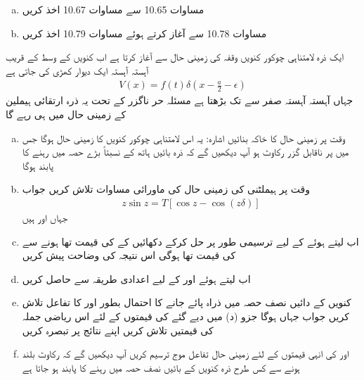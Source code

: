 \begin{enumerate}[a.]
\item
مساوات 10.65 سے مساوات 10.67 اخذ کریں 
\item
مساوات 10.78 سے آغاز کرتے ہوئے مساوات 10.79 اخذ کریں 
\end{enumerate}
ایک ذرہ لامتناہی چوکور کنویں وقفہ  کی زمینی حال سے آغاز کرتا ہے اب کنویں کے وسط کے قریب آہستہ آہستہ ایک دیوار کھڑی کی جاتی ہے 
\begin{align*}
V (x) = f (t) \delta (x - \frac{a}{2} - \epsilon)
\end{align*}
جہاں  آہستہ آہستہ صفر سے  تک بڑھتا ہے مسئلہ حر ناگزر کے تحت یہ ذرہ ارتقائی ہیملین کے زمینی حال میں ہی رہے گا 
\begin{enumerate}[a.]
\item
وقت  پر زمینی حال کا خاکہ بنائیں اشارہ: یہ اس لامتناہی چوکور کنویں کا زمینی حال ہوگا جس میں  پر ناقابل گزر رکاوٹ ہو آپ دیکھیں گے کہ ذرہ بائیں ہاتھ کے نسبتاً بڑے حصہ میں رہنے کا پابند ہوگا 
\item
وقت  پر ہیملٹنی کی زمینی حال کی ماورائی مساوات تلاش کریں جواب 
\begin{align*}
z \sin z = T [\cos z - \cos (z \delta)]
\end{align*}
جہاں    اور  ہیں 
\item
اب  لیتے ہوئے  کے لیے ترسیمی طور پر حل کرکے دکھائیں کے  کی قیمت  تھا  ہونے سے  کی قیمت  تھا  ہوگی اس نتیجہ کی وضاحت پیش کریں 
\item 
اب  لیتے ہوئے  اور  کے لیے  اعدادی طریقہ سے حاصل کریں 
\item
کنویں کے دائیں نصف حصہ میں ذراہ پائے جانے کا احتمال بطور  اور  کا تفاعل تلاش کریں جواب  جہاں  ہوگا جزو (د) میں دیے گئے  کی قیمتوں کے لئے اس ریاضی جملہ کی قیمتیں تلاش کریں اپنے نتائج پر تبصرہ کریں 
\item
{} اور  کی انہی قیمتوں کے لئے زمینی حال تفاعل موج ترسیم کریں آپ دیکھیں گے کہ رکاوٹ بلند ہونے سے کس طرح ذرہ کنویں کے بائیں نصف حصہ میں رہنے کا پابند ہو جاتا ہے 
\end{enumerate}
